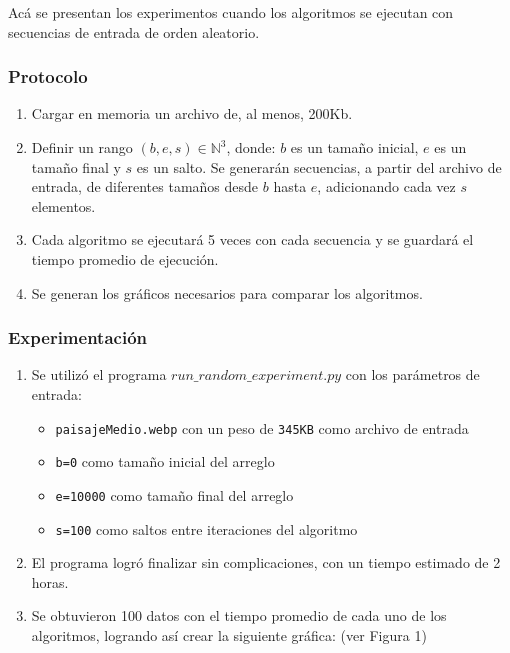 \documentclass[letter]{article}
\begin{document}
Acá se presentan los experimentos cuando los algoritmos se ejecutan con secuencias de entrada de orden aleatorio.

\subsubsection{Protocolo}
\begin{enumerate}
    \item Cargar en memoria un archivo de, al menos, 200Kb.
    \item Definir un rango $(b,e,s)\in\mathbb{N}^3$, donde: $b$ es un tamaño inicial, $e$ es un tamaño final y $s$ es un salto. Se generarán secuencias, a partir del archivo de entrada, de diferentes tamaños desde $b$ hasta $e$, adicionando cada vez $s$ elementos.
    \item Cada algoritmo se ejecutará 5 veces con cada secuencia y se guardará el tiempo promedio de ejecución.
    \item Se generan los gráficos necesarios para comparar los algoritmos.
\end{enumerate}

\subsubsection{Experimentación}
\begin{enumerate}
    \item Se utilizó el programa \texttt{$run\_random\_experiment.py$} con los parámetros de entrada:
    \begin{itemize}
        \item \texttt{paisajeMedio.webp} con un peso de \texttt{345KB} como archivo de entrada
        \item \texttt{b=0} como tamaño inicial del arreglo
        \item \texttt{e=10000} como tamaño final del arreglo
        \item \texttt{s=100} como saltos entre iteraciones del algoritmo
    \end{itemize}
    \item El programa logró finalizar sin complicaciones, con un tiempo estimado de 2 horas.
    \item Se obtuvieron 100 datos con el tiempo promedio de cada uno de los algoritmos, logrando así crear la siguiente gráfica: (ver Figura 1)
\end{enumerate}
\end{document}
